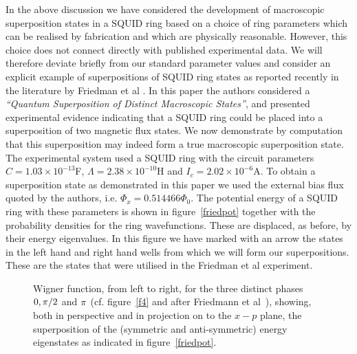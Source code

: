 \documentclass[twocolumn,a4paper,superscriptaddress,showpacs,floatfix,pra]{revtex4}
\begin{document}
In  the  above  discussion  we  have  considered  the  development  of
macroscopic superposition states in a  SQUID ring based on a choice of
ring parameters  which can  be realised by  fabrication and  which are
physically reasonable. However, this  choice does not connect directly
with published  experimental data.  We will therefore  deviate briefly
from our standard parameter values and consider an explicit example of
superpositions  of  SQUID ring  states  as  reported  recently in  the
literature by Friedman et  al \cite{FriedmanPCTL00}. In this paper the
authors  considered   a  \emph{``Quantum  Superposition   of  Distinct
Macroscopic States''}, and  presented experimental evidence indicating
that a SQUID ring could be placed into a superposition of two magnetic
flux states. We now demonstrate by computation that this superposition
may  indeed   form  a   true  macroscopic  superposition   state.  The
experimental  system used  a SQUID  ring with  the  circuit parameters
$C=1.03\times      10^{-13}$\textrm{F},      $\Lambda      =2.38\times
10^{-10}$\textrm{H}   and  $I_{c}=2.02\times   10^{-6}$\textrm{A}.  To
obtain a superposition state as demonstrated in this paper we used the
external bias flux quoted by the authors, i.e. $\Phi _{x}=0.514466\Phi
_{0}$. The potential  energy of a SQUID ring  with these parameters is
shown in figure~\ref{friedpot} together with the probability densities
for the ring  wavefunctions. These are displaced, as  before, by their
energy eigenvalues.  In this figure we  have marked with  an arrow the
states in the  left hand and right hand wells from  which we will form
our superpositions.  These are  the states that  were utilised  in the
Friedman et al experiment.

\begin{figure}[!t]
\begin{center}
\end{center}
\caption{Wigner function,  from left to right, for  the three distinct
phases       $0,\protect\pi/2$       and      $\protect\pi$       (cf.
figure~\protect\ref{f4}       and       after       Friedmann       et
al~\protect\cite{FriedmanPCTL00}), showing, both in perspective and in
projection on to the $x-p$  plane, the superposition of the (symmetric
and    anti-symmetric)   energy    eigenstates    as   indicated    in
figure~\protect\ref{friedpot}.}
\label{friedwig}
\end{figure}
\end{document}
